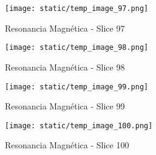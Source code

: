 \documentclass[12pt,a4paper]{article}%
\begin{document}
%


\begin{figure}[H]%
\centering%
\texttt{[image: static/temp\_image\_97.png]}%
\caption{Resonancia Magnética {-} Slice 97}%
\end{figure}

%


\begin{figure}[H]%
\centering%
\texttt{[image: static/temp\_image\_98.png]}%
\caption{Resonancia Magnética {-} Slice 98}%
\end{figure}

%


\begin{figure}[H]%
\centering%
\texttt{[image: static/temp\_image\_99.png]}%
\caption{Resonancia Magnética {-} Slice 99}%
\end{figure}

%


\begin{figure}[H]%
\centering%
\texttt{[image: static/temp\_image\_100.png]}%
\caption{Resonancia Magnética {-} Slice 100}%
\end{figure}

%
\end{document}

